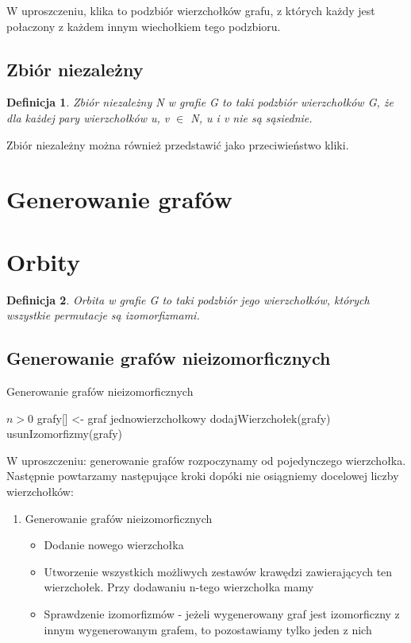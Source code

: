 \documentclass[11pt]{article}
\newtheorem{definition}{Definicja}[section]
\begin{document}
   W uproszczeniu, klika to podzbiór wierzchołków grafu, z których każdy jest połaczony z każdem innym wiechołkiem tego podzbioru.
   
  \subsection{Zbiór niezależny}
  \begin{definition}
    Zbiór niezależny N w grafie G to taki podzbiór wierzchołków G, że dla każdej pary wierzchołków u, v $\in$ N, u i v nie są sąsiednie. 
  \end{definition}
  
  Zbiór niezależny można również przedstawić jako przeciwieństwo kliki.

  
\section{Generowanie grafów}
\section{Orbity}
\begin{definition}
  Orbita w grafie G to taki podzbiór jego wierzchołków, których wszystkie permutacje są izomorfizmami. 
\end{definition}

\subsection{Generowanie grafów nieizomorficznych} 

\begin{algorithm}
  \caption{Generowanie grafów nieizomorficznych}
  \begin{algorithmic}
  \REQUIRE $n > 0 $
  \STATE grafy[] <- graf jednowierzchołkowy 
    \STATE dodajWierzchołek(grafy)
    \STATE usunIzomorfizmy(grafy)
  \ENDWHILE
  \end{algorithmic}
  \end{algorithm}

W uproszczeniu: generowanie grafów rozpoczynamy od pojedynczego wierzchołka.
Następnie powtarzamy następujące kroki dopóki nie osiągniemy docelowej liczby wierzchołków:
\begin{enumerate}
 \item Generowanie grafów nieizomorficznych 

 \begin{itemize}
 \item  Dodanie nowego wierzchołka  

 \item Utworzenie wszystkich możliwych zestawów krawędzi zawierających ten wierzchołek. Przy dodawaniu n-tego wierzchołka mamy 

 \item Sprawdzenie izomorfizmów - jeżeli wygenerowany graf jest izomorficzny z innym wygenerowanym grafem, to pozostawiamy tylko jeden z nich 
 
 \end{itemize}
\end{enumerate}
\end{document}
